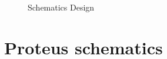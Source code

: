   \begin{figure}
  \noindent{}
  \caption{Schematics Design}
\end{figure}
\newpage
\section{Proteus schematics}

